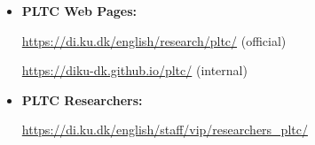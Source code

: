 \documentclass[rgb,dvipsnames,aspectratio=169]{beamer}
\begin{document}
\begin{frame}[fragile]


  \vfill
  \begin{itemize}
  \item \textbf{PLTC Web Pages:}

    \url{https://di.ku.dk/english/research/pltc/} (official)

    \url{https://diku-dk.github.io/pltc/} (internal)

    \vfill

  \item \textbf{PLTC Researchers:}

    \url{https://di.ku.dk/english/staff/vip/researchers_pltc/}

  \end{itemize}

\end{frame}
\end{document}
